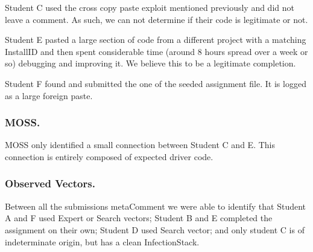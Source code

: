\documentclass[10pt]{article}
\newcommand{\installID}{InstallID\xspace}
\newcommand{\metaComment}{metaComment\xspace}
\newcommand{\infectionStack}{InfectionStack\xspace}
\begin{document}
Student C used the cross copy paste exploit mentioned previously and did not leave a comment.  As such, we can not determine if their code is legitimate or not.

Student E pasted a large section of code from a different project with a matching \installID and then spent considerable time (around 8 hours spread over a week or so) debugging and improving it.  We believe this to be a legitimate completion.

Student F found and submitted the one of the seeded assignment file.  It is logged as a large foreign paste.

\subsubsection{MOSS.\hspace{0.5em}\phantom{}}

MOSS only identified a small connection between Student C and E.  This connection is entirely composed of expected driver code. 
\subsubsection{Observed Vectors.\hspace{0.5em}\phantom{}}

Between all the submissions \metaComment we were able to identify that Student A and F used Expert or Search vectors; Student B and E completed the assignment on their own; Student D used Search vector; and only student C is of indeterminate origin, but has a clean \infectionStack.
\end{document}
